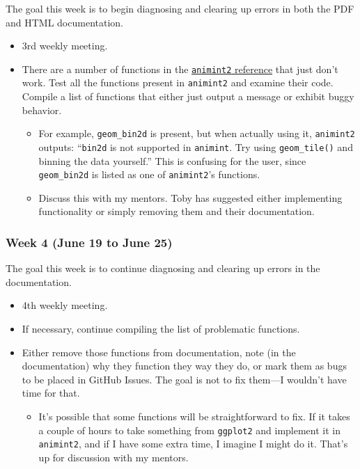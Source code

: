 \documentclass[
]{article}
\providecommand{\tightlist}{%
  \setlength{\itemsep}{0pt}\setlength{\parskip}{0pt}}\usepackage{longtable,booktabs,array}
\begin{document}
The goal this week is to begin diagnosing and clearing up errors in both
the PDF and HTML documentation.

\begin{itemize}
\item
  3rd weekly meeting.
\item
  There are a number of functions in the
  \href{https://cran.r-project.org/web/packages/animint2/}{\texttt{animint2}
  reference} that just don't work. Test all the functions present in
  \texttt{animint2} and examine their code. Compile a list of functions
  that either just output a message or exhibit buggy behavior.

  \begin{itemize}
  \tightlist
  \item
    For example, \texttt{geom\_bin2d} is present, but when actually
    using it, \texttt{animint2} outputs: ``\texttt{bin2d} is not
    supported in \texttt{animint}. Try using \texttt{geom\_tile()} and
    binning the data yourself.'' This is confusing for the user, since
    \texttt{geom\_bin2d} is listed as one of \texttt{animint2}'s
    functions.
  \item
    Discuss this with my mentors. Toby has suggested either implementing
    functionality or simply removing them and their documentation.
  \end{itemize}
\end{itemize}

\hypertarget{week-4-june-19-to-june-25}{%
\subsubsection{Week 4 (June 19 to June
25)}\label{week-4-june-19-to-june-25}}

The goal this week is to continue diagnosing and clearing up errors in
the documentation.

\begin{itemize}
\item
  4th weekly meeting.
\item
  If necessary, continue compiling the list of problematic functions.
\item
  Either remove those functions from documentation, note (in the
  documentation) why they function they way they do, or mark them as
  bugs to be placed in GitHub Issues. The goal is not to fix them---I
  wouldn't have time for that.

  \begin{itemize}
  \tightlist
  \item
    It's possible that some functions will be straightforward to fix. If
    it takes a couple of hours to take something from \texttt{ggplot2}
    and implement it in \texttt{animint2}, and if I have some extra
    time, I imagine I might do it. That's up for discussion with my
    mentors.
  \end{itemize}
\end{itemize}
\end{document}
